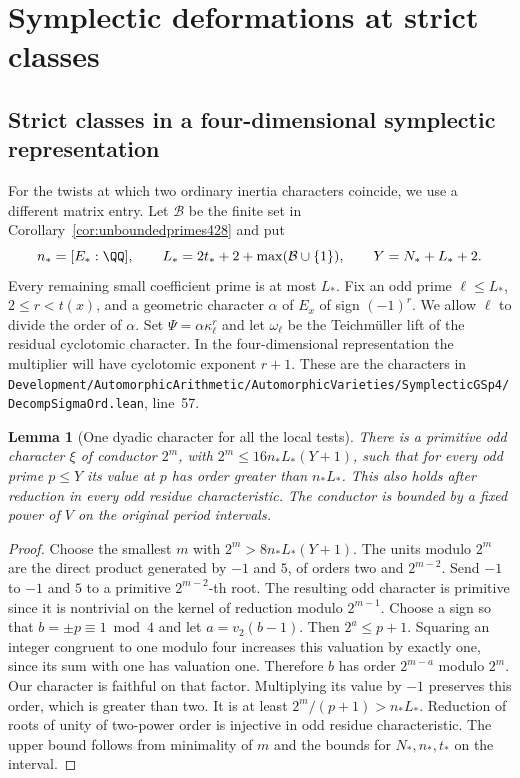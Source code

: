 \documentclass[a4paper,11pt]{article}
\newtheorem{lemma}[proposition]{Lemma}
\theoremstyle{definition}
\theoremstyle{remark}
\newcommand{\srcloc}[2]{{\small\nolinkurl{#1.lean}}, line~#2}
\numberwithin{equation}{section}
\begin{document}
\section{Symplectic deformations at strict classes}\label{nav:chapter-symplectic-classes}
\subsection{Strict classes in a four-dimensional symplectic representation}
\label{sec:symplecticstrict429}

For the twists at which two ordinary inertia characters coincide,
we use a different matrix entry. Let \(\mathcal B\) be the
finite set in Corollary~\ref{cor:unboundedprimes428} and put
\[
  n_*=[E_*:\QQ],\qquad
  L_*=2t_*+2+\max(\mathcal B\cup\{1\}),\qquad Y=N_*+L_*+2 .
\]
Every remaining small coefficient prime is at most \(L_*\).
Fix an odd prime \(\ell\le L_*\), \(2\le r<t(x)\), and a
geometric character \(\alpha\) of \(E_x\) of sign \((-1)^r\).
We allow \(\ell\) to divide the order of \(\alpha\). Set
\(\Psi=\alpha\kappa_\ell^r\) and let \(\omega_\ell\) be the
Teichm\"uller lift of the residual cyclotomic character. In
the four-dimensional representation the multiplier will
have cyclotomic exponent \(r+1\).
These are the characters in
\srcloc{Development/AutomorphicArithmetic/AutomorphicVarieties/SymplecticGSp4/DecompSigmaOrd}{57}.

\begin{lemma}[One dyadic character for all the local tests]\leavevmode
\label{lem:commondyadictwist429}
There is a primitive odd character \(\xi\) of conductor \(2^m\),
with \(2^m\le16n_*L_*(Y+1)\), such that for every odd prime
\(p\le Y\) its value at \(p\) has order greater than \(n_*L_*\).
This also holds after reduction in every odd residue
characteristic. The conductor is bounded by a fixed power of
\(V\) on the original period intervals.
\end{lemma}
\begin{proof}
Choose the smallest \(m\) with \(2^m>8n_*L_*(Y+1)\).
The units modulo \(2^m\) are the direct product generated by
\(-1\) and \(5\), of orders two and \(2^{m-2}\). Send \(-1\)
to \(-1\) and \(5\) to a primitive \(2^{m-2}\)-th root.
The resulting odd character is primitive since it is nontrivial
on the kernel of reduction modulo \(2^{m-1}\).
Choose a sign so that \(b=\pm p\equiv1\bmod4\) and let
\(a=v_2(b-1)\). Then \(2^a\le p+1\). Squaring an integer
congruent to one modulo four increases this valuation by exactly
one, since its sum with one has valuation one. Therefore \(b\)
has order \(2^{m-a}\) modulo \(2^m\). Our character is faithful
on that factor. Multiplying its value by \(-1\) preserves this
order, which is greater than two. It is at least
\(2^m/(p+1)>n_*L_*\). Reduction of roots of unity of
two-power order is injective in odd residue characteristic.
The upper bound follows from minimality of \(m\) and the bounds
for \(N_*,n_*,t_*\) on the interval.
\end{proof}
\end{document}
